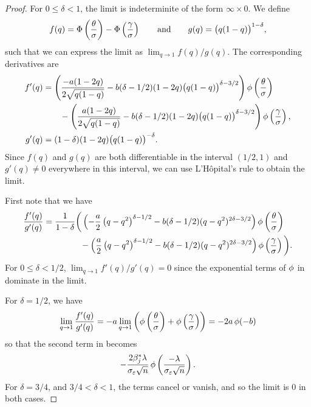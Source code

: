 \begin{proof}
  For \(0 \leq \delta < 1\), the limit is indeterminite of the form \(\infty \times 0\). We define
  \[
    f(q) = \operatorname{\Phi} \left(\frac{\theta}{\sigma}\right) - \operatorname{\Phi} \left(\frac{\gamma}{\sigma}\right) \qquad\text{and}\qquad g(q) = \big(q(1-q)\big)^{1-\delta},
  \]
  such that we can express the limit as \(\lim_{q \rightarrow 1}f(q)/g(q)\). The corresponding derivatives are
  \[
    \begin{aligned}
      f'(q) & = \left(\frac{-a(1-2q)}{2\sqrt{q(1-q)}} - b(\delta - 1/2)(1-2q)\big(q(1-q)\big)^{\delta - 3/2}\right)\operatorname{\phi}\left(\frac{\theta}{\sigma}\right)        \\
            & \qquad - \left(\frac{a(1-2q)}{2\sqrt{q(1-q)}} - b(\delta - 1/2)(1-2q)\big(q(1-q)\big)^{\delta - 3/2}\right)\operatorname{\phi}\left(\frac{\gamma}{\sigma}\right), \\
      g'(q) & = (1 - \delta)(1-2q)\big(q(1-q)\big)^{-\delta}.
    \end{aligned}
  \]
  Since \(f(q)\) and \(g(q)\) are both differentiable in the interval \((1/2, 1)\) and \(g'(q) \neq 0\) everywhere in this interval, we can use L'Hôpital's rule to obtain the limit.

  First note that we have
  \begin{equation}
    \label{eq:eval-qlimit-secondterm}
    \begin{multlined}
      \frac{f'(q)}{g'(q)} = \frac{1}{1 - \delta}\bigg(\left( -\frac{a}{2}\left(q - q^2\right)^{\delta - 1/2} - b(\delta - 1/2)(q -q^2)^{2\delta - 3/2}\right)\pdf\left(\frac{\theta}{\sigma}\right) \\- \left( \frac{a}{2}\left(q - q^2\right)^{\delta - 1/2} - b(\delta - 1/2)(q -q^2)^{2\delta - 3/2}\right)\pdf\left(\frac{\gamma}{\sigma}\right)\bigg).
    \end{multlined}
  \end{equation}
  For \(0 \leq \delta < 1/2\), $\lim_{q \rightarrow 1}f'(q)/g'(q) = 0$ since the exponential terms of \(\operatorname{\phi}\) in  dominate in the limit.

  For \(\delta = 1/2\), we have
  \[
    \lim_{q \rightarrow 1} \frac{f'(q)}{g'(q)} = -a \lim_{q \rightarrow 1}\left(\operatorname{\phi}\left(\frac{\theta}{\sigma}\right) + \operatorname{\phi}\left(\frac{\gamma}{\sigma}\right)\right) = -2a \operatorname{\phi}(-b)
  \]
  so that the second term in  becomes
  \begin{equation}
    \label{eq:eval-qlimit-stdcase}
    -\frac{2\beta_j^*\lambda}{\sigma_\varepsilon\sqrt{n}} \operatorname{\phi}\left(\frac{-\lambda}{\sigma_\varepsilon\sqrt{n}}\right).
  \end{equation}
  For \(\delta = 3/4\), and \(3/4 <\delta < 1\), the terms cancel or vanish, and so the limit is 0 in both cases.


\end{proof}
